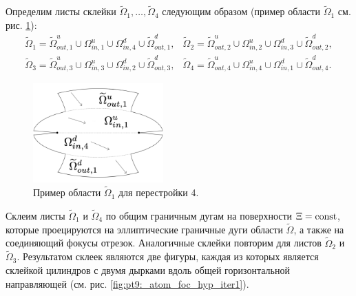 Определим листы склейки $\widetilde{\Omega}_1, \ldots, \widetilde{\Omega}_4$ следующим образом (пример области $\widetilde{\Omega}_1$ см. рис. \ref{fig:pt9:_atom_4_domain}):
\begin{equation}
\begin{array}{cc}
\widetilde{\Omega}_1 = \widetilde{\Omega}_{out, 1}^u \cup \Omega_{in, 1}^u \cup \Omega_{in, 4}^d \cup \widetilde{\Omega}_{out, 1}^d, &
\widetilde{\Omega}_2 = \widetilde{\Omega}_{out, 2}^u \cup \Omega_{in, 2}^u \cup \Omega_{in, 3}^d \cup \widetilde{\Omega}_{out, 2}^d, \\
\widetilde{\Omega}_3 = \widetilde{\Omega}_{out, 3}^u \cup \Omega_{in, 3}^u \cup \Omega_{in, 2}^d \cup \widetilde{\Omega}_{out, 3}^d, &
\widetilde{\Omega}_4 = \widetilde{\Omega}_{out, 4}^u \cup \Omega_{in, 4}^u \cup \Omega_{in, 1}^d \cup \widetilde{\Omega}_{out, 4}^d.
\end{array}
\label{eq:case4Omegas}
\end{equation}
\begin{figure}[!htb]
\centering
\includegraphics[width=5cm]{images/section2/atoms/atom_4_domain.pdf}
    \caption{Пример области $\widetilde{\Omega}_1$ для перестройки 4.}
    \label{fig:pt9:_atom_4_domain}
\end{figure}


Склеим листы $\widetilde{\Omega}_1$ и  $\widetilde{\Omega}_4$ по общим граничным дугам на поверхности $\Xi = \mathrm{const}$, которые проецируются на эллиптические граничные дуги области $\widetilde{\Omega}$, а также на  
соединяющий фокусы отрезок. Аналогичные склейки повторим для листов $\widetilde{\Omega}_2$ и  $\widetilde{\Omega}_3$. Результатом склеек являются две фигуры, каждая из которых является склейкой цилиндров с двумя дырками вдоль общей горизонтальной направляющей (см. рис. \ref{fig:pt9:_atom_foc_hyp_iter1}).


